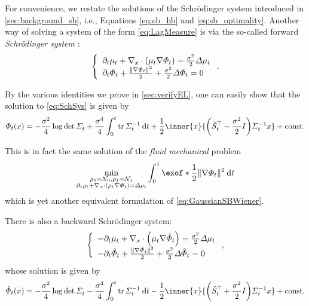 For convenience, we restate the solutions of the Schr\"odinger system introduced in \cref{sec:background_sb}, i.e., Equations \eqref{eq:sb_hb} and \eqref{eq:sb_optimality}.
Another way of solving a system of the form \eqref{eq:LagMeasure} is via the so-called forward \emph{Schr\"odinger system} \citep{chen2021stochastic, leonard2013survey}:
\begin{align}
\label{eq:SchSys}
\left\{\begin{array}{lr}
\del_t \mu_t +\Div\parens*{  \mu_t\nabla \pot } = \frac{\sdev^2}{2}  \Laplace\mu_t \\
       \del_t \pot + \frac{\norm{ \nabla\pot}^2}{2} + \frac{\sdev^2}{2} \Laplace \pot = 0
        \end{array}\right..
\end{align}

By the various identities we prove in \cref{sec:verifyEL}, one can easily show that the solution to \eqref{eq:SchSys} is given by
\begin{align}
\pot(\point) = - \frac{\sdev^2}{4} \log\det\Sigmasol + \frac{\sdev^4}{4}  \int_{0}^t \tr \Sigmasolinv \dt + \frac{1}{2} \inner{\point}{\parens*{\Ht^\top- \frac{\sdev^2}{2}\eye}\Sigmasolinv \point} + \const
\end{align}

This is in fact the same solution of the \emph{fluid mechanical} problem
\begin{align}
\min_{\ssstyle\substack{{\measure[0] = \Ninit, \measure[\horizon] = \Nend} \\ {\pt\measure +\Div(\measure \vecsol) =\Laplace \measure }}} \int_{0}^\horizon  \exof*{\frac{1}{2} \norm{\vecsol}^2 } \dt
\end{align}which is yet another equivalent formulation of \eqref{eq:GaussianSBWiener}.

There is also a backward Schr\"odinger system:
\begin{align}
\left\{\begin{array}{lr}
-\del_t \mu_t + \Div\parens*{  \mu_t\nabla \rpot } =\frac{\sdev^2}{2}  \Laplace\mu_t  \\
      - \del_t \rpot + \frac{\norm{ \nabla\rpot}^2}{2} +\frac{\sdev^2}{2} \Laplace \rpot = 0
        \end{array}\right.,
\end{align}
whose solution is given by
\begin{align}
\rpot(\point) = - \frac{\sdev^2}{4} \log\det\Sigmasol - \frac{\sdev^4}{4}  \int_{0}^t \tr \Sigmasolinv \dt - \frac{1}{2} \inner{\point}{ \parens*{\Ht^\top+\frac{\sdev^2}{2}\eye}\Sigmasolinv \point} + \const
\end{align}

